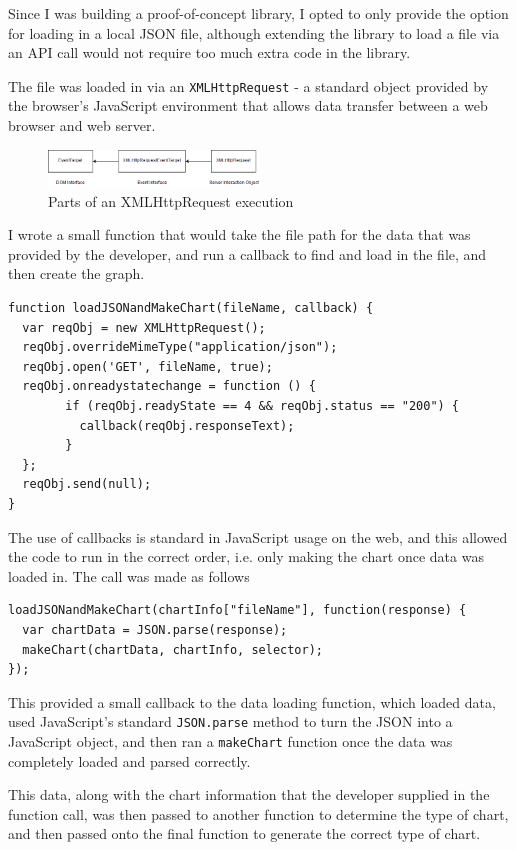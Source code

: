 \documentclass[ %
                    author={Aleena Baig},
                supervisor={Dr Simon Lock},
                    degree={BSc},
                     title={On Making Web Accessible Graphs},
                  subtitle={},
                      year={2019} ]{dissertation}
\begin{document}
Since I was building a proof-of-concept library, I opted to only provide the option for loading in a local JSON file, although extending the library to load a file via an API call would not require too much extra code in the library.

The file was loaded in via an \texttt{XMLHttpRequest} - a standard object provided by the browser's JavaScript environment that allows data transfer between a web browser and web server.

\begin{figure}[h]
\centering
\includegraphics[width=0.5\textwidth]{images/XMLHttpRequest.png}
\caption{Parts of an XMLHttpRequest execution}
\end{figure}

I wrote a small function that would take the file path for the data that was provided by the developer, and run a callback to find and load in the file, and then create the graph.

\begin{lstlisting}
function loadJSONandMakeChart(fileName, callback) {
  var reqObj = new XMLHttpRequest();
  reqObj.overrideMimeType("application/json");
  reqObj.open('GET', fileName, true);
  reqObj.onreadystatechange = function () {
        if (reqObj.readyState == 4 && reqObj.status == "200") {
          callback(reqObj.responseText);
        }
  };
  reqObj.send(null);
}
\end{lstlisting}

The use of callbacks is standard in JavaScript usage on the web, and this allowed the code to run in the correct order, i.e. only making the chart once data was loaded in. The call was made as follows

\begin{lstlisting}
loadJSONandMakeChart(chartInfo["fileName"], function(response) {
  var chartData = JSON.parse(response);
  makeChart(chartData, chartInfo, selector);
});
\end{lstlisting}

This provided a small callback to the data loading function, which loaded data, used JavaScript's standard \texttt{JSON.parse} method to turn the JSON into a JavaScript object, and then ran a \texttt{makeChart} function once the data was completely loaded and parsed correctly.

This data, along with the chart information that the developer supplied in the function call, was then passed to another function to determine the type of chart, and then passed onto the final function to generate the correct type of chart.
\end{document}
